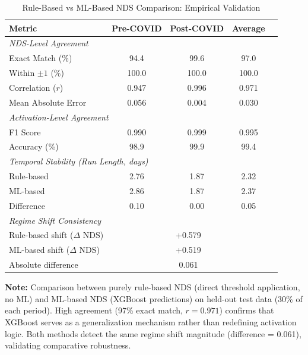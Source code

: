 
\begin{table}[htbp]
\centering
\caption{Rule-Based vs ML-Based NDS Comparison: Empirical Validation}
\label{tab:rule_ml_comparison}
\small
\begin{tabular}{@{}lcccc@{}}
\toprule
\textbf{Metric} & \textbf{Pre-COVID} & \textbf{Post-COVID} & \textbf{Average} \\
\midrule
\multicolumn{4}{l}{\textit{NDS-Level Agreement}} \\
\quad Exact Match (\%) & 94.4 & 99.6 & 97.0 \\
\quad Within $\pm 1$ (\%) & 100.0 & 100.0 & 100.0 \\
\quad Correlation ($r$) & 0.947 & 0.996 & 0.971 \\
\quad Mean Absolute Error & 0.056 & 0.004 & 0.030 \\
\midrule
\multicolumn{4}{l}{\textit{Activation-Level Agreement}} \\
\quad F1 Score & 0.990 & 0.999 & 0.995 \\
\quad Accuracy (\%) & 98.9 & 99.9 & 99.4 \\
\midrule
\multicolumn{4}{l}{\textit{Temporal Stability (Run Length, days)}} \\
\quad Rule-based & 2.76 & 1.87 & 2.32 \\
\quad ML-based & 2.86 & 1.87 & 2.37 \\
\quad Difference & 0.10 & 0.00 & 0.05 \\
\midrule
\multicolumn{4}{l}{\textit{Regime Shift Consistency}} \\
\quad Rule-based shift ($\Delta$ NDS) & \multicolumn{3}{c}{+0.579} \\
\quad ML-based shift ($\Delta$ NDS) & \multicolumn{3}{c}{+0.519} \\
\quad Absolute difference & \multicolumn{3}{c}{0.061} \\
\bottomrule
\end{tabular}
\vspace{0.5em}
\begin{flushleft}
\footnotesize
\textbf{Note:} Comparison between purely rule-based NDS (direct threshold application, no ML) 
and ML-based NDS (XGBoost predictions) on held-out test data (30\% of each period). 
High agreement (97\% exact match, $r = 0.971$) confirms that XGBoost serves as a 
generalization mechanism rather than redefining activation logic. Both methods detect 
the same regime shift magnitude (difference = 0.061), validating comparative robustness.
\end{flushleft}
\end{table}


